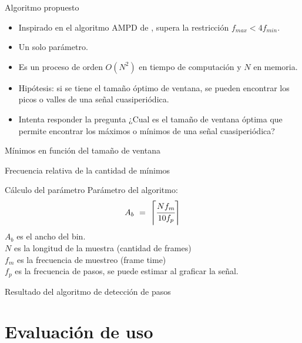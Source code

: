 \documentclass{beamer} %
\begin{document}
\begin{frame}{Algoritmo propuesto}
    \begin{itemize}
        \item Inspirado en el algoritmo AMPD de \cite{scholkmann}, supera la restricción $f_{max} < 4 f_{min}$.
        \item Un solo parámetro.
        \item Es un proceso de orden $O(N^2)$ en tiempo de computación y $N$ en memoria. 
        \item Hipótesis: si se tiene el tamaño óptimo de ventana, se pueden encontrar los picos o valles de una señal cuasiperiódica.
        \item Intenta responder la pregunta ¿Cual es el tamaño de ventana óptima que permite encontrar los máximos o mínimos de una señal cuasiperiódica?
    \end{itemize}
\end{frame}

\begin{frame}{Mínimos en función del tamaño de ventana}
    
\end{frame}

\begin{frame}{Frecuencia relativa de la cantidad de mínimos}
    
\end{frame}

\begin{frame}{Cálculo del parámetro}
    Parámetro del algoritmo:
    \begin{equation}\label{ancho_b}
         A_b\ =\ \left\lceil \cfrac{N f_m}{10 f_p} \right\rceil
    \end{equation}
$A_b$ es el ancho del bin. \\    
$N$ es la longitud de la muestra (cantidad de frames) \\
$f_m$ es la frecuencia de muestreo (frame time) \\
$f_p$ es la frecuencia de pasos, se puede estimar al graficar la señal. 
\end{frame}

\begin{frame}{Resultado del algoritmo de detección de pasos}
    
\end{frame}

\section{Evaluación de uso}
\end{document}
